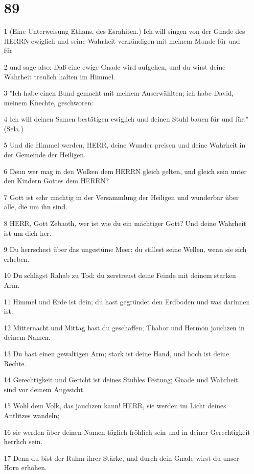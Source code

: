 \chapter{89}

\par 1 (Eine Unterweisung Ethans, des Esrahiten.) Ich will singen von der Gnade des HERRN ewiglich und seine Wahrheit verkündigen mit meinem Munde für und für
\par 2 und sage also: Daß eine ewige Gnade wird aufgehen, und du wirst deine Wahrheit treulich halten im Himmel.
\par 3 "Ich habe einen Bund gemacht mit meinem Auserwählten; ich habe David, meinem Knechte, geschworen:
\par 4 Ich will deinen Samen bestätigen ewiglich und deinen Stuhl bauen für und für." (Sela.)
\par 5 Und die Himmel werden, HERR, deine Wunder preisen und deine Wahrheit in der Gemeinde der Heiligen.
\par 6 Denn wer mag in den Wolken dem HERRN gleich gelten, und gleich sein unter den Kindern Gottes dem HERRN?
\par 7 Gott ist sehr mächtig in der Versammlung der Heiligen und wunderbar über alle, die um ihn sind.
\par 8 HERR, Gott Zebaoth, wer ist wie du ein mächtiger Gott? Und deine Wahrheit ist um dich her.
\par 9 Du herrschest über das ungestüme Meer; du stillest seine Wellen, wenn sie sich erheben.
\par 10 Du schlägst Rahab zu Tod; du zerstreust deine Feinde mit deinem starken Arm.
\par 11 Himmel und Erde ist dein; du hast gegründet den Erdboden und was darinnen ist.
\par 12 Mitternacht und Mittag hast du geschaffen; Thabor und Hermon jauchzen in deinem Namen.
\par 13 Du hast einen gewaltigen Arm; stark ist deine Hand, und hoch ist deine Rechte.
\par 14 Gerechtigkeit und Gericht ist deines Stuhles Festung; Gnade und Wahrheit sind vor deinem Angesicht.
\par 15 Wohl dem Volk, das jauchzen kann! HERR, sie werden im Licht deines Antlitzes wandeln;
\par 16 sie werden über deinen Namen täglich fröhlich sein und in deiner Gerechtigkeit herrlich sein.
\par 17 Denn du bist der Ruhm ihrer Stärke, und durch dein Gnade wirst du unser Horn erhöhen.
